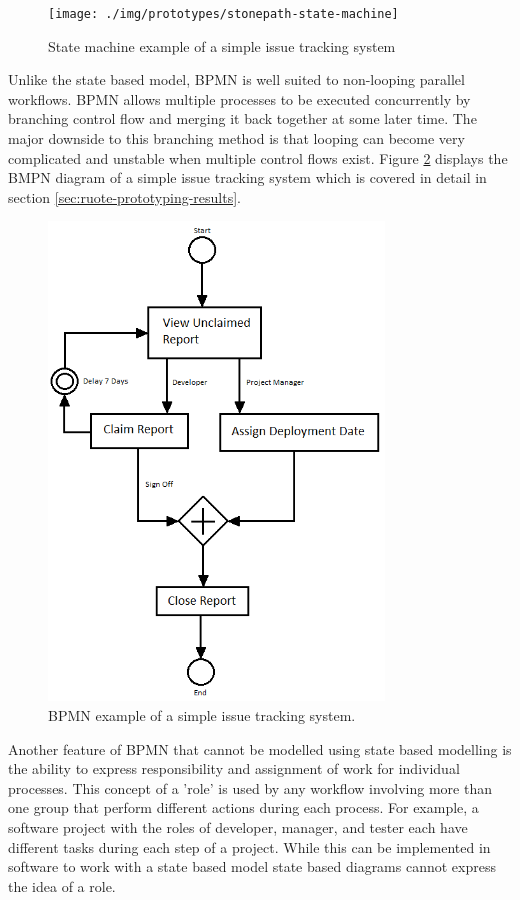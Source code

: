 \documentclass[document.tex]{subfiles}
\begin{document}
\begin{figure}[!ht]
\centering \texttt{[image: ./img/prototypes/stonepath-state-machine]}
\caption{State machine example of a simple issue tracking system}
\label{fig:state-machine-example-diagram}
\end{figure}

\FloatBarrier

Unlike the state based model, BPMN is well suited to non-looping parallel workflows. BPMN allows multiple processes to be executed concurrently by branching  control flow and merging it back together at some later time. The major downside to this branching method is that looping can become very complicated and unstable when multiple control flows exist. Figure \ref{fig:bpmn-example-diagram} displays the BMPN diagram of a simple issue tracking system which is covered in detail in section \ref{sec:ruote-prototyping-results}.

\begin{figure}[!ht]
\centering \includegraphics[height=5in]{./img/prototypes/ruote-bpmn-diagram}
\caption{BPMN example of a simple issue tracking system.}
\label{fig:bpmn-example-diagram}
\end{figure}

\FloatBarrier

Another feature of BPMN that cannot be modelled using state based modelling is the ability to express responsibility and assignment of work for individual processes. This concept of a 'role' is used by any workflow involving more than one group that perform different actions during each process. For example, a software project with the roles of developer, manager, and tester each have different tasks during each step of a project. While this can be implemented in software to work with a state based model state based diagrams cannot express the idea of a role.
\end{document}
